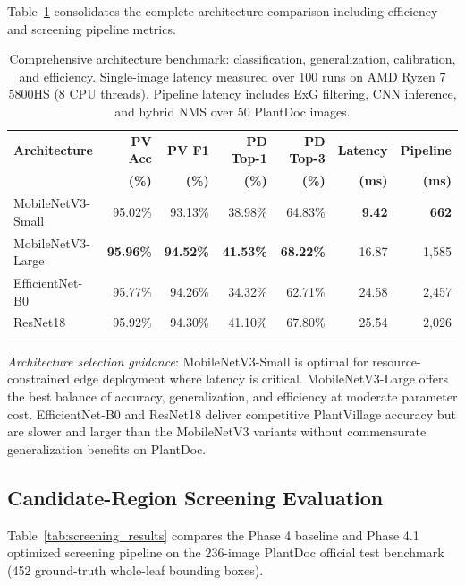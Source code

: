 \documentclass[pdflatex,sn-mathphys-num]{sn-jnl}
\theoremstyle{thmstyleone}%
\theoremstyle{thmstyletwo}%
\theoremstyle{thmstylethree}%
\begin{document}
Table~\ref{tab:full_comparison} consolidates the complete architecture comparison
including efficiency and screening pipeline metrics.

\begin{table}[h]
\caption{Comprehensive architecture benchmark: classification, generalization, calibration,
and efficiency. Single-image latency measured over 100 runs on AMD Ryzen 7 5800HS (8 CPU
threads). Pipeline latency includes ExG filtering, CNN inference, and hybrid NMS over
50 PlantDoc images.}\label{tab:full_comparison}%
\setlength{\tabcolsep}{3pt}%
\begin{tabular*}{\textwidth}{@{\extracolsep\fill}lrrrrrr}
\toprule
\textbf{Architecture} & \textbf{PV Acc} & \textbf{PV F1} & \textbf{PD Top-1} & \textbf{PD Top-3} & \textbf{Latency} & \textbf{Pipeline} \\
& \textbf{(\%)} & \textbf{(\%)} & \textbf{(\%)} & \textbf{(\%)} & \textbf{(ms)} & \textbf{(ms)} \\
\midrule
MobileNetV3-Small  & 95.02\% & 93.13\% & 38.98\% & 64.83\% & \textbf{9.42}  & \textbf{662} \\
MobileNetV3-Large  & \textbf{95.96\%} & \textbf{94.52\%} & \textbf{41.53\%} & \textbf{68.22\%} & 16.87 & 1{,}585 \\
EfficientNet-B0    & 95.77\% & 94.26\% & 34.32\% & 62.71\% & 24.58 & 2{,}457 \\
ResNet18           & 95.92\% & 94.30\% & 41.10\% & 67.80\% & 25.54 & 2{,}026 \\
\botrule
\end{tabular*}
\end{table}

\textit{Architecture selection guidance}: MobileNetV3-Small is optimal for
resource-constrained edge deployment where latency is critical. MobileNetV3-Large
offers the best balance of accuracy, generalization, and efficiency at moderate
parameter cost. EfficientNet-B0 and ResNet18 deliver competitive PlantVillage accuracy
but are slower and larger than the MobileNetV3 variants without commensurate
generalization benefits on PlantDoc.

\subsection{Candidate-Region Screening Evaluation}
\label{sec:results_screening}

Table~\ref{tab:screening_results} compares the Phase 4 baseline and Phase 4.1 optimized
screening pipeline on the 236-image PlantDoc official test benchmark (452 ground-truth
whole-leaf bounding boxes).
\end{document}
